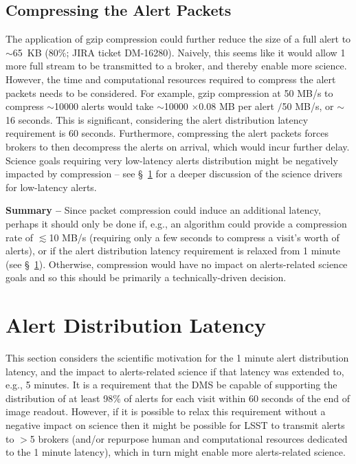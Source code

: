 \documentclass[DM,lsstdraft,authoryear,toc]{lsstdoc}
\begin{document}
\subsection{Compressing the Alert Packets}\label{ssec:packets_compress}

The application of gzip compression could further reduce the size of a full alert to $\sim$65~KB (80\%; JIRA ticket DM-16280).
Naively, this seems like it would allow 1 more full stream to be transmitted to a broker, and thereby enable more science.
However, the time and computational resources required to compress the alert packets needs to be considered.
For example, gzip compression at 50 MB/s to compress $\sim$10000 alerts would take $\sim$10000 $\times$0.08 MB per alert $/$50 MB/s, or $\sim$16 seconds.
This is significant, considering the alert distribution latency requirement is 60 seconds. 
Furthermore, compressing the alert packets forces brokers to then decompress the alerts on arrival, which would incur further delay.
Science goals requiring very low-latency alerts distribution might be negatively impacted by compression -- see \S~\ref{sec:latency} for a deeper discussion of the science drivers for low-latency alerts.

{\bf Summary --} Since packet compression could induce an additional latency, perhaps it should only be done if, e.g., an algorithm could provide a compression rate of $\lesssim$10 MB/s (requiring only a few seconds to compress a visit's worth of alerts), or if the alert distribution latency requirement is relaxed from 1 minute (see \S~\ref{sec:latency}).
Otherwise, compression would have no impact on alerts-related science goals and so this should be primarily a technically-driven decision.




\clearpage
\section{Alert Distribution Latency} \label{sec:latency}

This section considers the scientific motivation for the 1 minute alert distribution latency, and the impact to alerts-related science if that latency was extended to, e.g., 5 minutes.
It is a requirement that the DMS be capable of supporting the distribution of at least 98\% of alerts for each visit within 60 seconds of the end of image readout.
However, if it is possible to relax this requirement without a negative impact on science then it might be possible for LSST to transmit alerts to $>$5 brokers (and/or repurpose human and computational resources dedicated to the 1 minute latency), which in turn might enable more alerts-related science.
\end{document}
